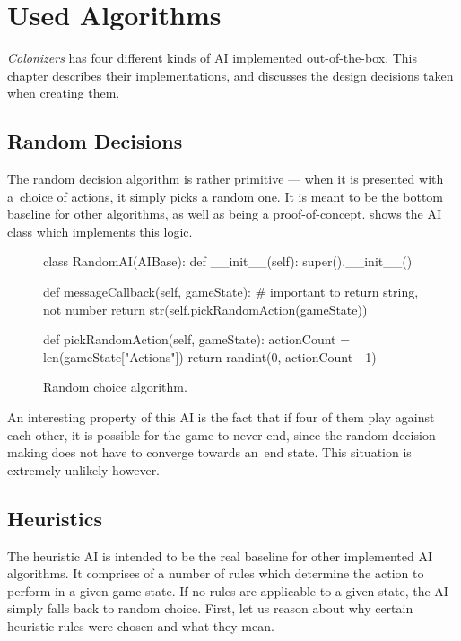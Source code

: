 \chapter{Used Algorithms}

\emph{Colonizers} has four different kinds of AI implemented out-of-the-box.
This chapter describes their implementations, and discusses the design decisions
taken when creating them.

\section{Random Decisions}

The random decision algorithm is rather primitive --- when it is presented with
a~choice of actions, it simply picks a random one. It is meant to be
the bottom baseline for other algorithms,
as well as being a proof-of-concept.  shows the AI class which
implements this logic.

\begin{figure}[h!]
\begin{code}[commandchars=\\\{\},codes={\catcode`\$=3\catcode`\^=7\catcode`\_=8}]
class RandomAI(AIBase):
    def \_\_init\_\_(self):
        super().\_\_init\_\_()

    def messageCallback(self, gameState):
        # important to return string, not number
        return str(self.pickRandomAction(gameState))

    def pickRandomAction(self, gameState):
        actionCount = len(gameState["Actions"])
        return randint(0, actionCount - 1)
\end{code}
\caption{Random choice algorithm.}\label{algo:random}
\end{figure}

An interesting property of this AI is the fact that if four of them play
against each other, it is possible for the game to never end, since
the random decision making does not have to converge towards an~end state.
This situation is extremely unlikely however.

\section{Heuristics}
\label{sec:algoheur}

The heuristic AI is intended to be the real baseline for other implemented AI algorithms.
It comprises of a number of rules which determine the action to perform in a given
game state. If no rules are applicable to a given state, the AI simply
falls back to random choice. First, let us reason about why certain heuristic rules
were chosen and what they mean.

